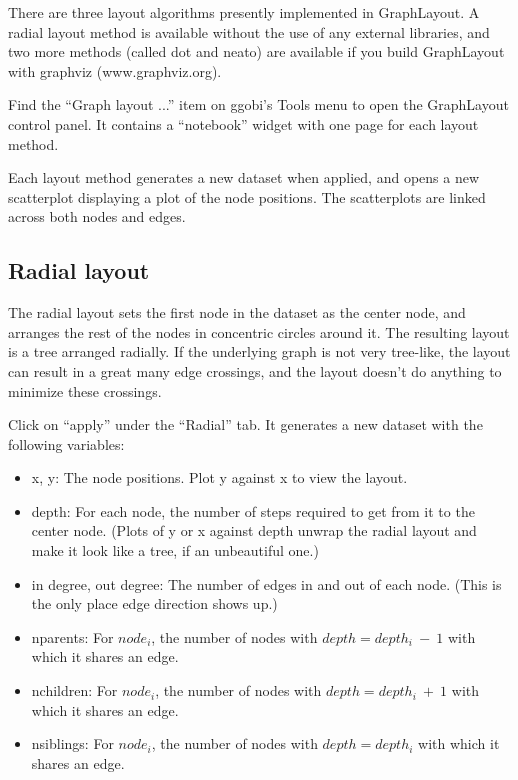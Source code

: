 \documentclass[11pt]{article}
\begin{document}
There are three layout algorithms presently implemented in GraphLayout.
A radial layout method is available without the use of any external
libraries, and two more methods (called dot and neato) are available
if you build GraphLayout with graphviz (www.graphviz.org).

Find the ``Graph layout ...'' item on ggobi's Tools menu
to open the GraphLayout control panel.  It contains a ``notebook''
widget with one page for each layout method.

Each layout method generates a new dataset when applied, and opens
a new scatterplot displaying a plot of the node positions.  The
scatterplots are linked across both nodes and edges.

\subsection {Radial layout}

The radial layout \cite{Wills99} sets the first node in the dataset
as the center node, and arranges the rest of the nodes in concentric
circles around it.  The resulting layout is a tree arranged radially.
If the underlying graph is not very tree-like, the layout can result
in a great many edge crossings, and the layout doesn't do anything to
minimize these crossings.

Click on ``apply'' under the ``Radial'' tab.  It generates a new
dataset with the following variables:

\begin{itemize}
\item x, y: The node positions.  Plot y against x to view the layout.
\item depth: For each node, the number of steps required to get from it
  to the center node. (Plots of y or x against depth unwrap the
  radial layout and make it look like a tree, if an unbeautiful one.)
\item in degree, out degree:  The number of edges in and out of each
  node. (This is the only place edge direction shows up.)
\item nparents: For $node_i$, the number of nodes with $depth = depth_i~-~1$
  with which it shares an edge. 
\item nchildren: For $node_i$, the number of nodes with $depth = depth_i~+~1$
  with which it shares an edge.
\item nsiblings: For $node_i$, the number of nodes with $depth = depth_i$
  with which it shares an edge.
\end{itemize}
\end{document}
